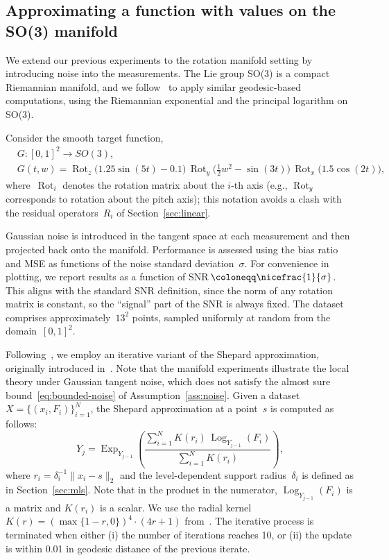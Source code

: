 \documentclass[12pt]{article}
\DeclareMathOperator{\Rot}{Rot}
\begin{document}
\subsection{Approximating a function with values on the SO(3) manifold}\label{sec:so3}

We extend our previous experiments to the rotation manifold setting by introducing noise into the measurements. The Lie group SO(3) is a compact Riemannian manifold, and we follow~\cite{sharon2022multiscale} to apply similar geodesic-based computations, using the Riemannian exponential and the principal logarithm on SO(3).

Consider the smooth target function,
\begin{equation}\label{eq:so3-target}
\begin{split} 
&G:[0,1]^2 \to SO(3), \\
&G(t,w) = \Rot_z\big(1.25\sin(5t)-0.1\big)\, \Rot_y\big(\tfrac{1}{2}w^2 - \sin(3t)\big)\, \Rot_x\big(1.5\cos(2t)\big),
\end{split}
\end{equation}
where~$\Rot_i$ denotes the rotation matrix about the $i$-th axis (e.g., $\Rot_y$ corresponds to rotation about the pitch axis); this notation avoids a clash with the residual operators~$R_i$ of Section~\ref{sec:linear}.

Gaussian noise is introduced in the tangent space at each measurement and then projected back onto the manifold. Performance is assessed using the bias ratio and MSE as functions of the noise standard deviation~$\sigma$. For convenience in plotting, we report results as a function of SNR$\,\coloneqq \nicefrac{1}{\sigma}$. This aligns with the standard SNR definition, since the norm of any rotation matrix is constant, so the ``signal'' part of the SNR is always fixed. The dataset comprises approximately~$13^2$ points, sampled uniformly at random from the domain~$[0,1]^2$.

Following~\cite{sharon2022multiscale, manton2004globally}, we employ an iterative variant of the Shepard approximation, originally introduced in~\cite{shepard1968two}. Note that the manifold experiments illustrate the local theory under Gaussian tangent noise, which does not satisfy the almost sure bound~\eqref{eq:bounded-noise} of Assumption~\ref{ass:noise}. Given a dataset~$X = \{(x_i, F_i) \}_{i=1}^N$, the Shepard approximation at a point~$s$ is computed as follows:
\begin{equation*}
   Y_j = \operatorname{Exp}_{Y_{j-1}}\left( \frac{\sum_{i=1}^N K(r_i) \, \operatorname{Log}_{Y_{j-1}}(F_i)} {\sum_{i=1}^N K(r_i)}\right),
\end{equation*}
where $r_i = \delta_i^{-1} \|x_i - s\|_2$ and the level-dependent support radius~$\delta_i$ is defined as in Section~\ref{sec:mls}. Note that in the product in the numerator, $\operatorname{Log}_{Y_{j-1}}(F_i)$ is a matrix and $K(r_i)$ is a scalar. We use the radial kernel~$K(r) = (\max\{1-r, 0 \})^4 \cdot (4r+1)$ from~\cite{wendland2004scattered}. The iterative process is terminated when either (i) the number of iterations reaches 10, or (ii) the update is within 0.01 in geodesic distance of the previous iterate.
\end{document}

